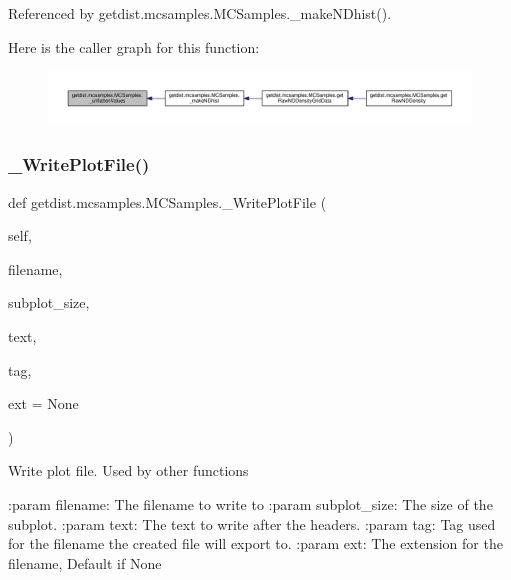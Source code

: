 Referenced by getdist.\+mcsamples.\+M\+C\+Samples.\+\_\+make\+N\+Dhist().

Here is the caller graph for this function\+:
\nopagebreak
\begin{figure}[H]
\begin{center}
\leavevmode
\includegraphics[width=350pt]{classgetdist_1_1mcsamples_1_1MCSamples_a3847cc1c604f47b2fefca5c9d9d2b28b_icgraph}
\end{center}
\end{figure}
\mbox{\label{classgetdist_1_1mcsamples_1_1MCSamples_a7ce3493951d42ba01b959cf3b22b4004}} 
\subsubsection{\texorpdfstring{\+\_\+\+Write\+Plot\+File()}{\_WritePlotFile()}}
{\footnotesize\ttfamily def getdist.\+mcsamples.\+M\+C\+Samples.\+\_\+\+Write\+Plot\+File (\begin{DoxyParamCaption}\item[{}]{self,  }\item[{}]{filename,  }\item[{}]{subplot\+\_\+size,  }\item[{}]{text,  }\item[{}]{tag,  }\item[{}]{ext = {\ttfamily None} }\end{DoxyParamCaption})\hspace{0.3cm}{\ttfamily [private]}}

\begin{DoxyVerb}Write plot file. 
Used by other functions

:param filename: The filename to write to
:param subplot_size: The size of the subplot.
:param text: The text to write after the headers.
:param tag: Tag used for the filename the created file will export to.
:param ext: The extension for the filename, Default if None
\end{DoxyVerb}
 

